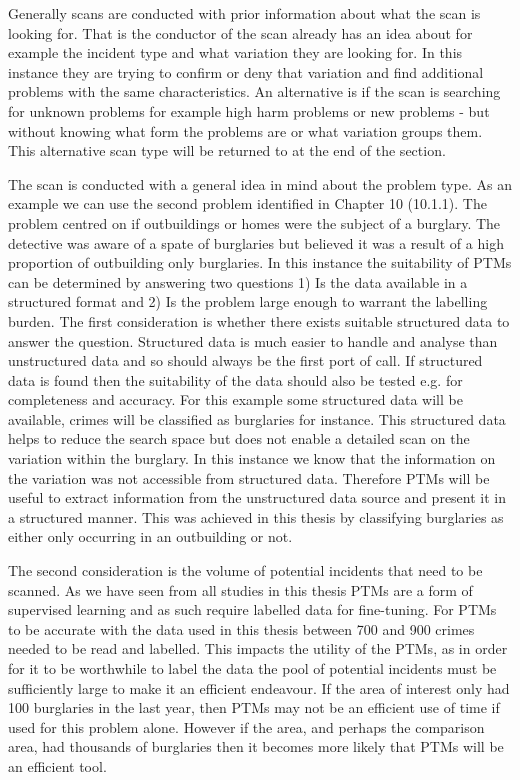 Generally scans are conducted with prior information about what the scan is looking for. That is the conductor of the scan already has an idea about for example the incident type and what variation they are looking for. In this instance they are trying to confirm or deny that variation and find additional problems with the same characteristics. An alternative is if the scan is searching for unknown problems for example high harm problems or new problems - but without knowing what form the problems are or what variation groups them. This alternative scan type will be returned to at the end of the section.

The scan is conducted with a general idea in mind about the problem type. As an example we can use the second problem identified in Chapter 10 (10.1.1). The problem centred on if outbuildings or homes were the subject of a burglary. The detective was aware of a spate of burglaries but believed it was a result of a high proportion of outbuilding only burglaries.  In this instance the suitability of PTMs can be determined by answering two questions 1) Is the data available in a structured format and 2) Is the problem large enough to warrant the labelling burden. The first consideration is whether there exists suitable structured data to answer the question. Structured data is much easier to handle and analyse than unstructured data and so should always be the first port of call. If structured data is found then the suitability of the data should also be tested e.g. for completeness and accuracy.  For this example some structured data will be available, crimes will be classified as burglaries for instance. This structured data helps to reduce the search space but does not enable a detailed scan on the variation within the burglary. In this instance we know that the information on the variation was not accessible from structured data. Therefore PTMs will be useful to extract information from the unstructured data source and present it in a structured manner. This was achieved in this thesis by classifying burglaries as either only occurring in an outbuilding or not.  

The second consideration is the volume of potential incidents that need to be scanned. As we have seen from all studies in this thesis PTMs are a form of supervised learning and as such require labelled data for fine-tuning. For PTMs to be accurate with the data used in this thesis between 700 and 900 crimes needed to be read and labelled. This impacts the utility of the PTMs, as in order for it to be worthwhile to label the data the pool of potential incidents must be sufficiently large to make it an efficient endeavour. If the area of interest only had 100 burglaries in the last year, then PTMs may not be an efficient use of time if used for this problem alone. However if the area, and perhaps the comparison area, had thousands of burglaries then it becomes more likely that PTMs will be an efficient tool.

